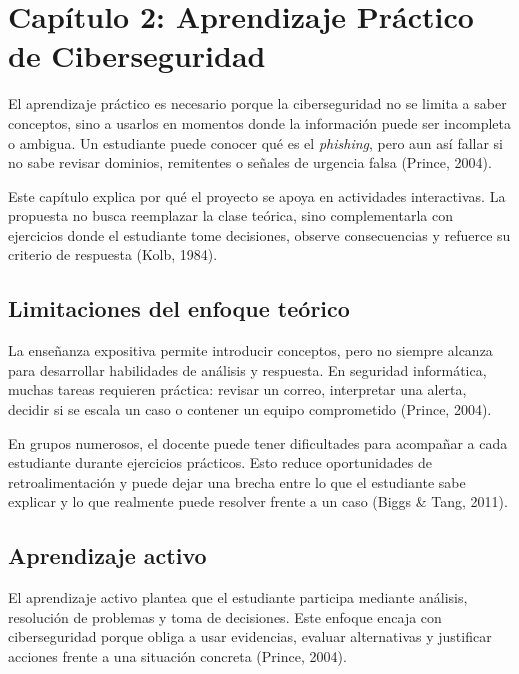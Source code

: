 \section[Capítulo 2: Aprendizaje Práctico de Ciberseguridad]{\centering Capítulo 2: Aprendizaje Práctico de Ciberseguridad}

El aprendizaje práctico es necesario porque la ciberseguridad no se limita a saber conceptos, sino a usarlos en momentos donde la información puede ser incompleta o ambigua. Un estudiante puede conocer qué es el \textit{phishing}, pero aun así fallar si no sabe revisar dominios, remitentes o señales de urgencia falsa (Prince, 2004).

Este capítulo explica por qué el proyecto se apoya en actividades interactivas. La propuesta no busca reemplazar la clase teórica, sino complementarla con ejercicios donde el estudiante tome decisiones, observe consecuencias y refuerce su criterio de respuesta (Kolb, 1984).

\subsection{Limitaciones del enfoque teórico}

La enseñanza expositiva permite introducir conceptos, pero no siempre alcanza para desarrollar habilidades de análisis y respuesta. En seguridad informática, muchas tareas requieren práctica: revisar un correo, interpretar una alerta, decidir si se escala un caso o contener un equipo comprometido (Prince, 2004).

En grupos numerosos, el docente puede tener dificultades para acompañar a cada estudiante durante ejercicios prácticos. Esto reduce oportunidades de retroalimentación y puede dejar una brecha entre lo que el estudiante sabe explicar y lo que realmente puede resolver frente a un caso (Biggs \& Tang, 2011).

\subsection{Aprendizaje activo}

El aprendizaje activo plantea que el estudiante participa mediante análisis, resolución de problemas y toma de decisiones. Este enfoque encaja con ciberseguridad porque obliga a usar evidencias, evaluar alternativas y justificar acciones frente a una situación concreta (Prince, 2004).

